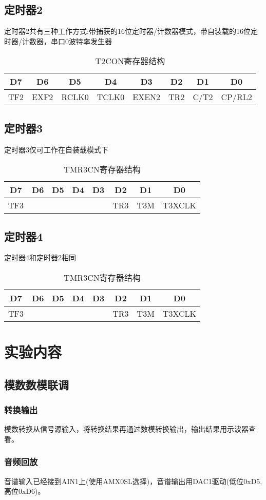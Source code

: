 \begin{spacing}{1.3}
\subsection{定时器2}
定时器2共有三种工作方式:带捕获的16位定时器/计数器模式，带自装载的16位定时器/计数器，串口0波特率发生器
\begin{table}[!htbp]
  \centering
  \caption{T2CON寄存器结构}
  \begin{tabular}{|c|c|c|c|c|c|c|c|}
    \hline
    D7&D6&D5&D4&D3&D2&D1&D0\\
      \hline
    TF2&EXF2&RCLK0&TCLK0&EXEN2&TR2&C/T2&CP/RL2\\
    \hline
  \end{tabular}

\end{table}

\subsection{定时器3}
定时器3仅可工作在自装载模式下
\begin{table}[!htbp]
  \centering
  \caption{TMR3CN寄存器结构}
  \begin{tabular}{|c|c|c|c|c|c|c|c|}
    \hline
    D7&D6&D5&D4&D3&D2&D1&D0\\
      \hline
    TF3&&&&&TR3&T3M&T3XCLK\\
    \hline
  \end{tabular}

\end{table}

\subsection{定时器4}
定时器4和定时器2相同
\begin{table}[!htbp]
  \centering
  \caption{TMR3CN寄存器结构}
  \begin{tabular}{|c|c|c|c|c|c|c|c|}
    \hline
    D7&D6&D5&D4&D3&D2&D1&D0\\
      \hline
    TF3&&&&&TR3&T3M&T3XCLK\\
    \hline
  \end{tabular}

\end{table}
\section{实验内容}

\subsection{模数数模联调}
\subsubsection{转换输出}
模数转换从信号源输入，将转换结果再通过数模转换输出，输出结果用示波器查看。
\subsubsection{音频回放}
音谱输入已经接到AIN1上(使用AMX0SL选择)，音谱输出用DAC1驱动(低位0xD5,高位0xD6)。

\end{spacing}

